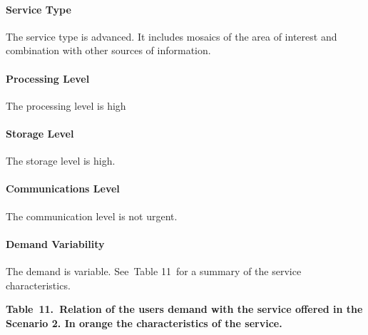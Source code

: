 \documentclass[a4paper]{article}
\begin{document}
\paragraph[Service Type]{ Service Type}
{
The service type is advanced. It includes mosaics of the area of
interest and combination with other sources of information.}

\paragraph[Processing Level]{ Processing Level}
{
The processing level is high}

\paragraph[Storage Level]{ Storage Level}
{
The storage level is high.}

\paragraph[Communications Level]{ Communications
Level}
{
The communication level is not urgent.}

\paragraph[Demand Variability]{ Demand
Variability}
\foreignlanguage{english}{The demand is variable. See\ }Table
11\foreignlanguage{english}{\ for a summary of the service
characteristics.}

\clearpage
\bigskip

{\centering\bfseries
\label{bkm:Ref377548086}Table\ 11.\ Relation of the users demand with
the service offered in the Scenario 2. In orange the characteristics of
the service.
\par}
\end{document}
